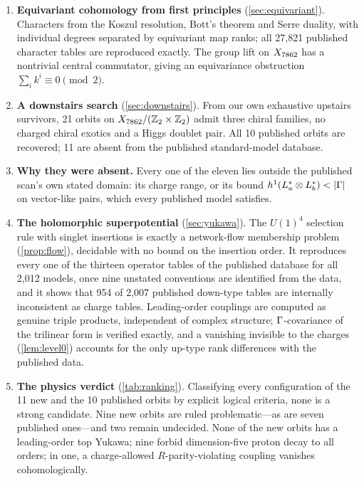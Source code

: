 \begin{enumerate}[leftmargin=*,label=\textbf{\arabic*.}]
  decision of stability (\cref{prop:decision}) certifies 53 of the 80 extra
  survivors unstable and finds one poly-stable, anomaly-free, correct-index GUT
  model on CICY 5256 that the catalog does not contain, with an exact
  real-algebraic witness.
\item \textbf{Equivariant cohomology from first principles}
  (\cref{sec:equivariant}). Characters from the Koszul resolution, Bott's
  theorem and Serre duality, with individual degrees separated by equivariant
  map ranks; all 27,821 published character tables are reproduced exactly. The group lift on $X_{7862}$ has a nontrivial central
  commutator, giving an equivariance obstruction $\sum_i k^i\equiv 0\pmod 2$.
\item \textbf{A downstairs search} (\cref{sec:downstairs}). From our own
  exhaustive upstairs survivors, 21 orbits on $X_{7862}/(\mathbb{Z}_2\times\mathbb{Z}_2)$ admit three
  chiral families, no charged chiral exotics and a Higgs doublet pair. All 10
  published orbits are recovered; 11 are absent from the published
  standard-model database.
\item \textbf{Why they were absent.} Every one of the eleven lies outside the
  published scan's own stated domain: its charge range, or its bound
  $h^1(L_a^*\otimes L_b^*)<|\Gam|$ on vector-like pairs, which every published
  model satisfies.
\item \textbf{The holomorphic superpotential} (\cref{sec:yukawa}). The $U(1)^4$
  selection rule with singlet insertions is exactly a network-flow membership
  problem (\cref{prop:flow}), decidable with no bound on the insertion order. It
  reproduces every one of the thirteen operator tables of the published database
  for all 2,012 models, once nine unstated conventions are identified from the
  data, and it shows that 954 of 2,007 published down-type tables are internally
  inconsistent as charge tables. Leading-order couplings are computed as genuine
  triple products, independent of complex structure; $\Gamma$-covariance of the
  trilinear form is verified exactly, and a vanishing invisible to the charges
  (\cref{lem:level0}) accounts for the only up-type rank differences with the
  published data.
\item \textbf{The physics verdict} (\cref{tab:ranking}). Classifying every
  configuration of the 11 new and the 10 published orbits by explicit logical
  criteria, none is a strong candidate. Nine new orbits are ruled
  problematic---as are seven published ones---and two remain undecided. None of
  the new orbits has a leading-order top Yukawa; nine forbid dimension-five
  proton decay to all orders; in one, a charge-allowed $R$-parity-violating
  coupling vanishes cohomologically.
\end{enumerate}

